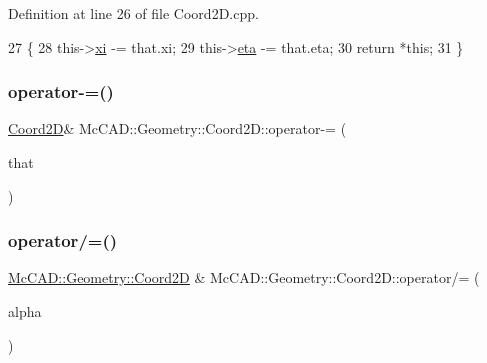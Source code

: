 Definition at line 26 of file Coord2\+D.\+cpp.


\begin{DoxyCode}
27                             \{
28     this->\hyperlink{classMcCAD_1_1Geometry_1_1Coord2D_a5b99b9ce570b6bd792bd485fb2f305bb}{xi} -= that.xi;
29     this->\hyperlink{classMcCAD_1_1Geometry_1_1Coord2D_afa71c0967f3d43fe50e61abd731c8f5e}{eta} -= that.eta;
30     \textcolor{keywordflow}{return} *\textcolor{keyword}{this};
31 \}
\end{DoxyCode}
\mbox{\label{classMcCAD_1_1Geometry_1_1Coord2D_ae45976df702cd27e38cb8ed1e54611e9}} 
\subsubsection{\texorpdfstring{operator-\/=()}{operator-=()}\hspace{0.1cm}{\footnotesize\ttfamily [2/2]}}
{\footnotesize\ttfamily \hyperlink{classMcCAD_1_1Geometry_1_1Coord2D}{Coord2D}\& Mc\+C\+A\+D\+::\+Geometry\+::\+Coord2\+D\+::operator-\/= (\begin{DoxyParamCaption}\item[{const \hyperlink{classMcCAD_1_1Geometry_1_1Coord2D}{Coord2D} \&}]{that }\end{DoxyParamCaption})}

\mbox{\label{classMcCAD_1_1Geometry_1_1Coord2D_af539fc29f86040064ae515d55ba6c3d6}} 
\subsubsection{\texorpdfstring{operator/=()}{operator/=()}\hspace{0.1cm}{\footnotesize\ttfamily [1/2]}}
{\footnotesize\ttfamily \hyperlink{classMcCAD_1_1Geometry_1_1Coord2D}{Mc\+C\+A\+D\+::\+Geometry\+::\+Coord2D} \& Mc\+C\+A\+D\+::\+Geometry\+::\+Coord2\+D\+::operator/= (\begin{DoxyParamCaption}\item[{const \hyperlink{namespaceMcCAD_1_1Geometry_ac043b37a4a7e849fca22869e1982d2f8}{coord\+\_\+type} \&}]{alpha }\end{DoxyParamCaption})}



